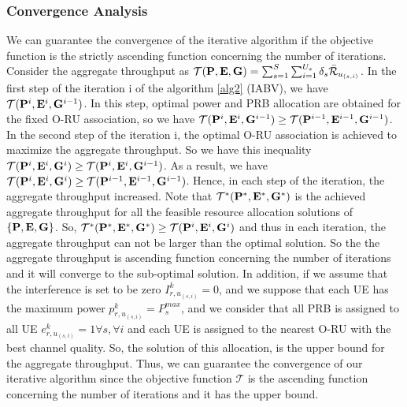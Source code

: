 \documentclass[lettersize,journal]{IEEEtran}
\begin{document}
\subsubsection{Convergence Analysis}
We can guarantee the convergence of the iterative algorithm if the objective function is the strictly ascending function concerning the number of iterations.%
Consider the aggregate throughput as $\mathcal{T(\bold{P},\bold{E},\bold{G})} =\sum_{s=1}^{S}\sum_{i=1}^{U_s}\delta_s \bar{\mathcal{R}}_{u_{(s,i)}}$.
In the first step of the iteration i of the algorithm \ref{alg2} (IABV), we have $\mathcal{T}(\bold{P}^{i},\bold{E}^i,\bold{G}^{i-1})$.
In this step, optimal power and PRB allocation are obtained for the fixed O-RU association, so we have
$\mathcal{T}(\bold{P}^{i},\bold{E}^i,\bold{G}^{i-1}) \geq \mathcal{T}(\bold{P}^{i-1},\bold{E}^{i-1},\bold{G}^{i-1})$.
In the second step of the iteration i, the optimal O-RU association is achieved to maximize the aggregate throughput. So we have this inequality
$\mathcal{T}(\bold{P}^{i},\bold{E}^i,\bold{G}^{i}) \geq \mathcal{T}(\bold{P}^{i},\bold{E}^{i},\bold{G}^{i-1})$.
As a result, we have
$\mathcal{T}(\bold{P}^{i},\bold{E}^i,\bold{G}^{i}) \geq \mathcal{T}(\bold{P}^{i-1},\bold{E}^{i-1},\bold{G}^{i-1})$.
Hence, in each step of the iteration, the aggregate throughput increased.
Note that $\mathcal{T}^*(\bold{P}^{*},\bold{E}^*,\bold{G}^{*})$ is the achieved aggregate throughput
for all the feasible resource allocation solutions of $\{\bold{P},\bold{E},\bold{G}\}$.
So, $\mathcal{T}^*(\bold{P}^{*},\bold{E}^*,\bold{G}^{*}) \geq \mathcal{T}(\bold{P}^{i},\bold{E}^i,\bold{G}^{i})$ and thus in each iteration, the aggregate throughput can not be larger than the optimal solution.
So the the aggregate throughput is ascending function concerning the number of iterations and it will converge to the sub-optimal solution.
In addition, if we assume that the interference is set to be zero ${I}_{r,u_{(s,i)}}^{k}=0$,
and we suppose that each UE has the maximum power $p_{r,u_{(s,i)}}^k = P_{s}^{max}$,
and we consider that all PRB is assigned to all UE $e_{r,u_{(s,i)}}^k = 1 \forall s,\forall i$
and each UE is assigned to the nearest O-RU with the best channel quality. So, the solution of this allocation, is the upper bound
for the aggregate throughput. Thus,
we can guarantee the convergence of our iterative algorithm since the objective function $\mathcal{T}$ is the ascending function concerning the number of iterations
 and it has the upper bound.
\end{document}

